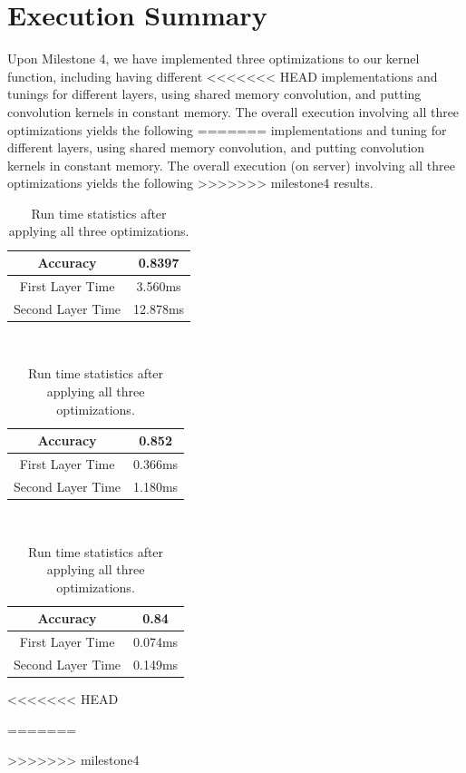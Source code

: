 \documentclass{article}
\begin{document}
\section{Execution Summary}
Upon Milestone 4, we have implemented three optimizations to our kernel function, including having different
<<<<<<< HEAD
implementations and tunings for different layers, using shared memory convolution, and putting convolution
kernels in constant memory. The overall execution involving all three optimizations yields the following
=======
implementations and tuning for different layers, using shared memory convolution, and putting convolution
kernels in constant memory. The overall execution (on server) involving all three optimizations yields the following
>>>>>>> milestone4
results.

\begin{table}[H]
    \centering
    \begin{minipage}{.32\linewidth}
        \begin{tabular}{c|c}
            Accuracy & 0.8397 \\ \hline
            First Layer Time & 3.560ms \\ \hline
            Second Layer Time & 12.878ms
        \end{tabular}
        \caption*{10000 images}
    \end{minipage}
    ~
    \begin{minipage}{.32\linewidth}
        \begin{tabular}{c|c}
            Accuracy & 0.852 \\ \hline
            First Layer Time & 0.366ms \\ \hline
            Second Layer Time & 1.180ms
        \end{tabular}
        \caption*{1000 images}
    \end{minipage}
    ~
    \begin{minipage}{.32\linewidth}
        \begin{tabular}{c|c}
            Accuracy & 0.84 \\ \hline
            First Layer Time & 0.074ms \\ \hline
            Second Layer Time & 0.149ms
        \end{tabular}
        \caption*{100 images}
    \end{minipage}
<<<<<<< HEAD
    \caption{GPU Run Time Statistics}
=======
    \caption{Run time statistics after applying all three optimizations.}
>>>>>>> milestone4
\end{table}
\end{document}

